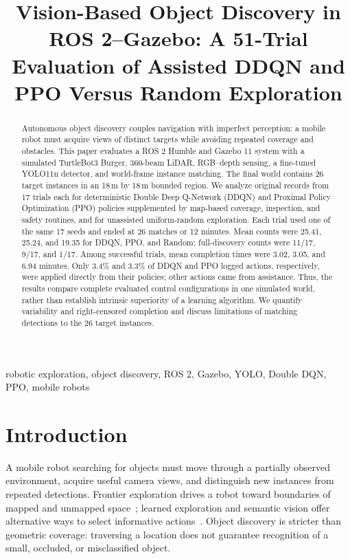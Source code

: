 \documentclass[conference]{IEEEtran}
\begin{document}
\title{Vision-Based Object Discovery in ROS 2--Gazebo: A 51-Trial Evaluation of Assisted DDQN and PPO Versus Random Exploration}
\author{
}
\maketitle
\begin{abstract}
Autonomous object discovery couples navigation with imperfect perception: a mobile robot must acquire views of distinct targets while avoiding repeated coverage and obstacles. This paper evaluates a ROS 2 Humble and Gazebo 11 system with a simulated TurtleBot3 Burger, 360-beam LiDAR, RGB--depth sensing, a fine-tuned YOLO11n detector, and world-frame instance matching. The final world contains 26 target instances in an 18\,m by 18\,m bounded region. We analyze original records from 17 trials each for deterministic Double Deep Q-Network (DDQN) and Proximal Policy Optimization (PPO) policies supplemented by map-based coverage, inspection, and safety routines, and for unassisted uniform-random exploration. Each trial used one of the same 17 seeds and ended at 26 matches or 12 minutes. Mean counts were 25.41, 25.24, and 19.35 for DDQN, PPO, and Random; full-discovery counts were 11/17, 9/17, and 1/17. Among successful trials, mean completion times were 3.02, 3.05, and 6.94 minutes. Only 3.4\% and 3.3\% of DDQN and PPO logged actions, respectively, were applied directly from their policies; other actions came from assistance. Thus, the results compare complete evaluated control configurations in one simulated world, rather than establish intrinsic superiority of a learning algorithm. We quantify variability and right-censored completion and discuss limitations of matching detections to the 26 target instances.
\end{abstract}
\begin{IEEEkeywords}
robotic exploration, object discovery, ROS 2, Gazebo, YOLO, Double DQN, PPO, mobile robots
\end{IEEEkeywords}

\section{Introduction}
A mobile robot searching for objects must move through a partially observed environment, acquire useful camera views, and distinguish new instances from repeated detections. Frontier exploration drives a robot toward boundaries of mapped and unmapped space~\cite{yamauchi1997}; learned exploration and semantic vision offer alternative ways to select informative actions~\cite{chaplot2020}. Object discovery is stricter than geometric coverage: traversing a location does not guarantee recognition of a small, occluded, or misclassified object.
\end{document}
